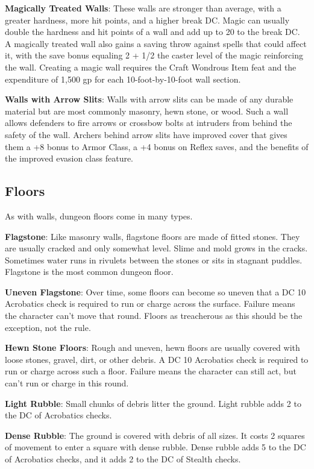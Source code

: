 \textbf{Magically Treated Walls}: These walls are stronger than average, with a greater hardness, more hit points, and a higher break DC. Magic can usually double the hardness and hit points of a wall and add up to 20 to the break DC. A magically treated wall also gains a saving throw against spells that could affect it, with the save bonus equaling 2 + 1/2 the caster level of the magic reinforcing the wall. Creating a magic wall requires the Craft Wondrous Item feat and the expenditure of 1,500 gp for each 10-foot-by-10-foot wall section.
				
\textbf{Walls with Arrow Slits}: Walls with arrow slits can be made of any durable material but are most commonly masonry, hewn stone, or wood. Such a wall allows defenders to fire arrows or crossbow bolts at intruders from behind the safety of the wall. Archers behind arrow slits have improved cover that gives them a +8 bonus to Armor Class, a +4 bonus on Reflex saves, and the benefits of the improved evasion class feature.
				
\subsection{Floors}

				
As with walls, dungeon floors come in many types.
				
\textbf{Flagstone}: Like masonry walls, flagstone floors are made of fitted stones. They are usually cracked and only somewhat level. Slime and mold grows in the cracks. Sometimes water runs in rivulets between the stones or sits in stagnant puddles. Flagstone is the most common dungeon floor.
				
\textbf{Uneven Flagstone}: Over time, some floors can become so uneven that a DC 10 Acrobatics check is required to run or charge across the surface. Failure means the character can't move that round. Floors as treacherous as this should be the exception, not the rule.
				
\textbf{Hewn Stone Floors}: Rough and uneven, hewn floors are usually covered with loose stones, gravel, dirt, or other debris. A DC 10 Acrobatics check is required to run or charge across such a floor. Failure means the character can still act, but can't run or charge in this round.
				
\textbf{Light Rubble}: Small chunks of debris litter the ground. Light rubble adds 2 to the DC of Acrobatics checks.
				
\textbf{Dense Rubble}: The ground is covered with debris of all sizes. It costs 2 squares of movement to enter a square with dense rubble. Dense rubble adds 5 to the DC of Acrobatics checks, and it adds 2 to the DC of Stealth checks.
				
